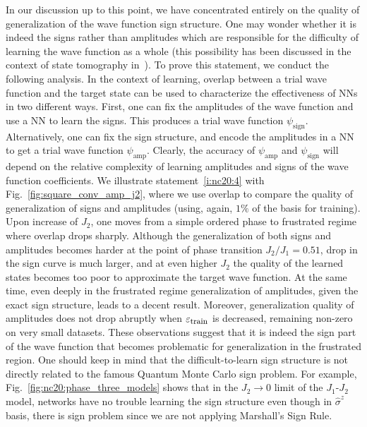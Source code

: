 In our discussion up to this point, we have concentrated entirely on the quality of generalization of the wave function sign structure. One may wonder whether it is indeed the signs rather than amplitudes which are responsible for the difficulty of learning the wave function as a whole (this possibility has been discussed in the context of state tomography in~\cite{torlai2018neural}). To prove this statement, we conduct the following analysis. In the context of learning, overlap between a trial wave function and the target state can be used to characterize the effectiveness of NNs in two different ways. First, one can fix the amplitudes of the wave function and use a NN to learn the signs. This produces a trial wave function $\psi_{\textrm{sign}}$. Alternatively, one can fix the sign structure, and encode the amplitudes in a NN to get a trial wave function $\psi_{\textrm{amp}}$.
Clearly, the accuracy of $\psi_{\textrm{amp}}$ and $\psi_{\textrm{sign}}$ will depend on the relative complexity of learning amplitudes and signs of the wave function coefficients. We illustrate statement~\ref{i:nc20:4} with Fig.~\ref{fig:square_conv_amp_j2}, where we use overlap to compare the quality of generalization of signs and amplitudes (using, again, $1\%$ of the basis for training). Upon increase of $J_2$, one moves from a simple ordered phase to frustrated regime where overlap drops sharply. Although the generalization of both signs and amplitudes becomes harder at the point of phase transition $J_2/J_1=0.51$, drop in the sign curve is much larger, and at even higher $J_2$ the quality of the learned states becomes too poor to approximate the target wave function. At the same time, even deeply in the frustrated regime generalization of amplitudes, given the exact sign structure, leads to a decent result. Moreover, generalization quality of amplitudes does not drop abruptly when $\varepsilon_{\mbox{\footnotesize train}}$ is decreased, remaining non-zero on very small datasets. %
These observations suggest that it is indeed the sign part of the wave function that becomes problematic for generalization in the frustrated region. One should keep in mind that the difficult-to-learn sign structure is not directly related to the famous Quantum Monte Carlo sign problem. For example, Fig.~\ref{fig:nc20:phase_three_models} shows that in the $J_2\to 0$ limit of the $J_1$-$J_2$ model, networks have no trouble learning the sign structure even though in $\hat{\sigma}^z$ basis, there is sign problem since we are not applying Marshall's Sign Rule.


